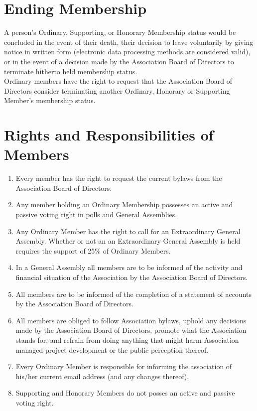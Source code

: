 \section{Ending Membership}

A person’s Ordinary, Supporting, or Honorary Membership status would be concluded in the event of their death, their decision to leave voluntarily by giving notice in written form (electronic data processing methods are considered valid), or in the event of a decision made by the Association Board of Directors to terminate hitherto held membership status.\\

Ordinary members have the right to request that the Association Board of Directors consider terminating another Ordinary, Honorary or Supporting Member’s membership status.\\




\section{Rights and Responsibilities of Members}

\begin{enumerate}
\item Every member has the right to request the current bylaws from the Association Board of Directors.
\item Any member holding an Ordinary Membership possesses an active and passive voting right in polls and General Assemblies.
\item Any Ordinary Member has the right to call for an Extraordinary General Assembly. Whether or not an an Extraordinary General Assembly is held requires the support of 25\% of Ordinary Members.
\item In a General Assembly all members are to be informed of the activity and financial situation of the Association by the Association Board of Directors.
\item All members are to be informed of the completion of a statement of accounts by the Association Board of Directors.
\item All members are obliged to follow Association bylaws, uphold any decisions made by the Association Board of Directors, promote what the Association stands for, and refrain from doing anything that might harm Association managed project development or the public perception thereof.
\item Every Ordinary Member is responsible for informing the association of his/her current email address (and any changes thereof).
\item Supporting and Honorary Members do not posses an active and passive voting right.
\end{enumerate}





